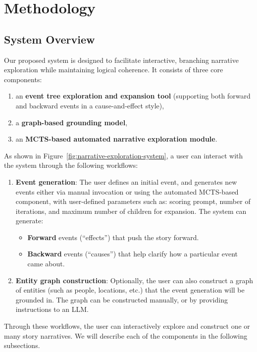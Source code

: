 \documentclass[11pt]{article}
\begin{document}
\section{Methodology}\label{sec:method}

\subsection{System Overview}

Our proposed system is designed to facilitate interactive, branching narrative exploration while maintaining logical coherence. It consists of three core components: 

\begin{enumerate}
    \item an \textbf{event tree exploration and expansion tool} (supporting both forward and backward events in a cause‐and‐effect style), 
    \item a \textbf{graph-based grounding model}, 
    \item an \textbf{MCTS-based automated narrative exploration module}.
\end{enumerate}

As shown in Figure~\ref{fig:narrative-exploration-system}, a user can interact with the system through the following workflows:

\begin{enumerate}
    \item \textbf{Event generation}: The user defines an initial event, and generates new events either via manual invocation or using the automated MCTS-based component, with user-defined parameters such as: scoring prompt, number of iterations, and maximum number of children for expansion. The system can generate:
    \begin{itemize}
        \item \textbf{Forward} events (``effects'') that push the story forward.
        \item \textbf{Backward} events (``causes'') that help clarify how a particular event came about.
    \end{itemize}
    \item \textbf{Entity graph construction}: Optionally, the user can also construct a graph of entities (such as people, locations, etc.) that the event generation will be grounded in. The graph can be constructed manually, or by providing instructions to an LLM.
\end{enumerate}

\noindent Through these workflows, the user can interactively explore and construct one or many story narratives. We will describe each of the components in the following subsections.
\end{document}
